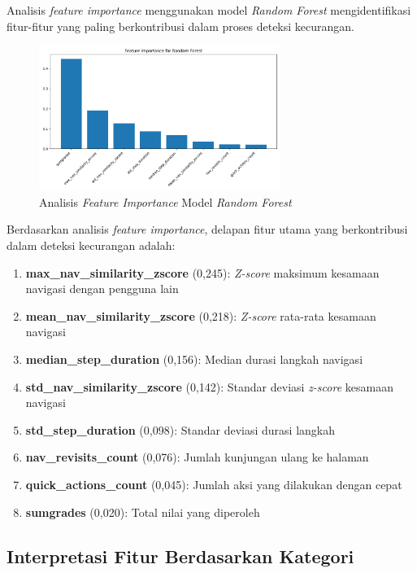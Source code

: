 Analisis \textit{feature importance} menggunakan model \textit{Random Forest} mengidentifikasi fitur-fitur yang paling berkontribusi dalam proses deteksi kecurangan.

\begin{figure}[htbp]
    \centering
    \includegraphics[width=0.7\textwidth]{figures/feature_importance_Random Forest.png}
    \caption{Analisis \textit{Feature Importance} Model \textit{Random Forest}}
    \label{fig:featureImportance}
\end{figure}

Berdasarkan analisis \textit{feature importance}, delapan fitur utama yang berkontribusi dalam deteksi kecurangan adalah:

\begin{enumerate}
    \item \textbf{max\_nav\_similarity\_zscore} (0,245): \textit{Z-score} maksimum kesamaan navigasi dengan pengguna lain
    \item \textbf{mean\_nav\_similarity\_zscore} (0,218): \textit{Z-score} rata-rata kesamaan navigasi
    \item \textbf{median\_step\_duration} (0,156): Median durasi langkah navigasi
    \item \textbf{std\_nav\_similarity\_zscore} (0,142): Standar deviasi \textit{z-score} kesamaan navigasi
    \item \textbf{std\_step\_duration} (0,098): Standar deviasi durasi langkah
    \item \textbf{nav\_revisits\_count} (0,076): Jumlah kunjungan ulang ke halaman
    \item \textbf{quick\_actions\_count} (0,045): Jumlah aksi yang dilakukan dengan cepat
    \item \textbf{sumgrades} (0,020): Total nilai yang diperoleh
\end{enumerate}

\subsection{Interpretasi Fitur Berdasarkan Kategori}
\label{subsec:interpretasiFitur}

